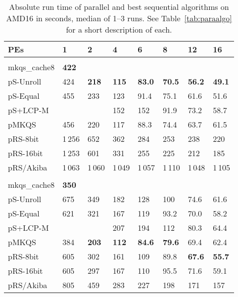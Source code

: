 \documentclass[a4paper]{myjournal}
\begin{document}
\begin{table}\centering\small
\caption{Absolute run time of parallel and best sequential algorithms on AMD16 in seconds, median of 1--3 runs. See Table~\ref{tab:paraalgo} for a short description of each.}\label{tab:absrun-AMD16}
\begin{tabularx}{\linewidth}{l|*{7}{>{\hfill}X}|@{}}
PEs & 1   & 2 & 4 & 6 & 8 & 12 & 16 \\ \hline
& \multicolumn{7}{l|}{\textbf{URLs}, , , } \\ \cline{2-8}
mkqs\_cache8 & \bf 422 &  &  &  &  &  &  \\
pS-Unroll &    424 & \bf 218 & \bf 115 & \bf 83.0 & \bf 70.5 & \bf 56.2 & \bf 49.1 \\
 pS-Equal &    455 &     233 &     123 &     91.4 &     75.1 &     61.6 &     51.6 \\
 pS+LCP-M &        &         &     152 &      152 &     91.9 &     73.2 &     58.7 \\
        pMKQS &    456 &     220 &     117 &     88.3 &     74.4 &     63.7 &     61.5 \\
     pRS-8bit & 1\,256 &     652 &     362 &      284 &      253 &      238 &      220 \\
    pRS-16bit & 1\,253 &     601 &     331 &      255 &      225 &      212 &      185 \\
    pRS/Akiba & 1\,063 &  1\,060 &  1\,049 &   1\,057 &   1\,110 &   1\,048 &   1\,105 \\ \hline
& \multicolumn{7}{l|}{\textbf{Random}, , , } \\ \cline{2-8}
mkqs\_cache8 & \bf 350 &  &  &  &  &  &  \\
pS-Unroll & 675 &     349 &     182 &      128 &      100 &     74.6 &     61.6 \\
 pS-Equal & 621 &     321 &     167 &      119 &     93.2 &     70.0 &     58.2 \\
 pS+LCP-M &     &         &     207 &      194 &      112 &     80.3 &     64.4 \\
        pMKQS & 384 & \bf 203 & \bf 112 & \bf 84.6 & \bf 79.6 &     69.4 &     62.4 \\
     pRS-8bit & 605 &     302 &     161 &      109 &     89.8 & \bf 67.6 & \bf 55.7 \\
    pRS-16bit & 605 &     297 &     167 &      110 &     95.5 &     71.6 &     59.1 \\
    pRS/Akiba & 805 &     459 &     283 &      227 &      198 &      171 &      157 \\ \hline

\end{tabularx}
\end{table}
\end{document}
